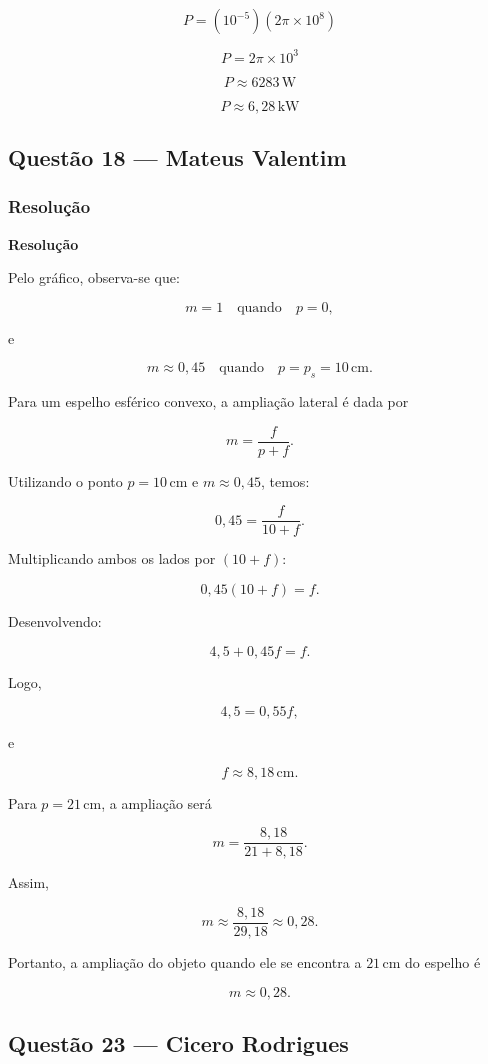 \documentclass[12pt,a4paper]{article}
\begin{document}
\[
P = (10^{-5}) (2\pi \times 10^8)
\]

\[
P = 2\pi \times 10^3
\]

\[
P \approx 6283\,\text{W}
\]

\[
\boxed{P \approx 6,28\,\text{kW}}
\]

\subsection{Questão 18 — Mateus Valentim}
\subsubsection{Resolução}
\textbf{Resolução}

Pelo gráfico, observa-se que:

\[
m = 1 \quad \text{quando} \quad p = 0,
\]

e

\[
m \approx 0{,}45 \quad \text{quando} \quad p = p_s = 10\,\text{cm}.
\]

Para um espelho esférico convexo, a ampliação lateral é dada por

\[
m=\frac{f}{p+f}.
\]

Utilizando o ponto \(p=10\,\text{cm}\) e \(m\approx 0{,}45\), temos:

\[
0{,}45=\frac{f}{10+f}.
\]

Multiplicando ambos os lados por \((10+f)\):

\[
0{,}45(10+f)=f.
\]

Desenvolvendo:

\[
4{,}5+0{,}45f=f.
\]

Logo,

\[
4{,}5=0{,}55f,
\]

e

\[
f\approx 8{,}18\,\text{cm}.
\]

Para \(p=21\,\text{cm}\), a ampliação será

\[
m=\frac{8{,}18}{21+8{,}18}.
\]

Assim,

\[
m\approx \frac{8{,}18}{29{,}18}
\approx 0{,}28.
\]

Portanto, a ampliação do objeto quando ele se encontra a \(21\,\text{cm}\) do espelho é

\[
\boxed{m \approx 0{,}28}.
\]

\subsection{Questão 23 — Cicero Rodrigues}
\end{document}
